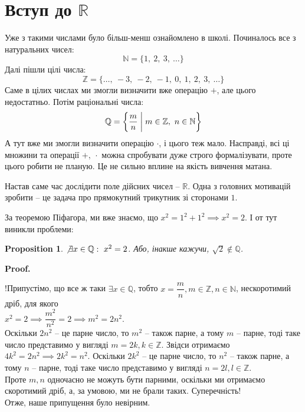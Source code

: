 \documentclass[a4paper, 14pt]{article}
\makeatletter
\def\qed{$\blacksquare$}
\theoremstyle{theoremdd}
\theoremstyle{theoremdd}
\theoremstyle{theoremdd}
\theoremstyle{theoremdd}
\theoremstyle{theoremdd}
\newtheorem{proposition}[theorem]{Proposition}
\theoremstyle{theoremdd}
\theoremstyle{theoremdd}
\theoremstyle{theoremdd}
\renewenvironment{proof}[1][Proof.\\]{\par
\pushQED{\hfill \qed}%
\normalfont \topsep6\p@\@plus6\p@\relax
\trivlist
\item\relax
{\bfseries
#1\@addpunct{.}}\hspace\labelsep\ignorespaces
}{%
\popQED\endtrivlist\@endpefalse
}
\makeatother
\begin{document}

\tableofcontents
\newpage

	\section{Вступ до $\mathbb{R}$}
	Уже з такими числами було більш-менш ознайомлено в школі. Починалось все з натуральних чисел:	
	$$ \mathbb{N} = \{1, \ 2, \ 3, \ \dots\} $$
	Далі пішли цілі  числа: \\
	$$ \mathbb{Z} = \{\dots,\ -3 ,\ -2, \ -1,\ 0,\ 1,\ 2,\ 3,\ \dots\} $$
	Саме в цілих числах ми змогли визначити вже операцію $+$, але цього недостатньо. Потім раціональні числа: \\
	$$ \mathbb{Q} = \left\{ \dfrac{m}{n} \biggm| m \in \mathbb{Z},\ n \in \mathbb{N} \right\} $$
	А тут вже ми змогли визначити операцію $\cdot$, і цього теж мало. Насправді, всі ці множини та операції $+,\ \cdot$ можна спробувати дуже строго формалізувати, проте цього робити не планую. Це не сильно вплине на якість вивчення матана.
	
	Настав саме час дослідити поле дійсних чисел -- $\mathbb{R}$. Одна з головних мотивацій зробити -- це задача про прямокутний трикутник зі сторонами $1$.
	\begin{figure}[H]
	\centering
	\end{figure}
	За теоремою Піфагора, ми вже знаємо, що
	$x^2 = 1^2 + 1^2 \implies x^2 = 2$. І от тут виникли проблеми:
	\begin{proposition}
	$\not\exists  x \in \mathbb{Q}: \ x^2 = 2$. Або, інакше кажучи, $\sqrt{2} \notin \mathbb{Q}$.
	\end{proposition}
	
	\begin{proof}
	!Припустімо, що все ж таки $\exists x \in \mathbb{Q}$, тобто $x= \dfrac{m}{n}, m \in \mathbb{Z}, n \in \mathbb{N}$, нескоротимий дріб, для якого\\
	$x^2 = 2 \implies \dfrac{m^2}{n^2} = 2 \implies m^2 = 2n^2$.\\
	Оскільки $2n^2$ -- це парне число, то $m^2$ -- також парне, а тому $m$ -- парне, тоді таке число представимо у вигляді $m = 2k, k \in \mathbb{Z}$. Звідси отримаємо $4k^2 = 2n^2 \implies 2k^2 = n^2$.
	Оскільки $2k^2$ -- це парне число, то $n^2$ -- також парне, а тому $n$ -- парне, тоді таке число представимо у вигляді $n = 2l, l \in \mathbb{Z}$.\\
	Проте $m,n$ одночасно не можуть бути парними, оскільки ми отримаємо скоротимий дріб, а, за умовою, ми не брали таких. Суперечність!\\
	Отже, наше припущення було невірним.
	\end{proof}
	
\end{document}
